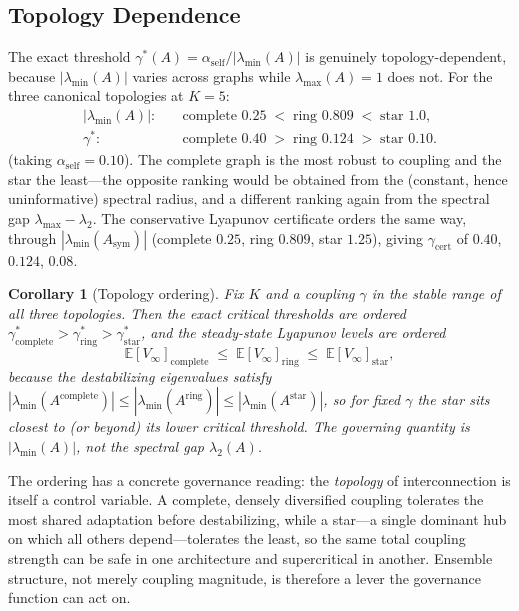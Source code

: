 \documentclass[12pt]{article}
\theoremstyle{plain}
\newtheorem{corollary}[theorem]{Corollary}
\theoremstyle{definition}
\newcommand{\E}{\mathbb{E}}
\newcommand{\abs}[1]{\left| #1 \right|}
\begin{document}
\subsection{Topology Dependence}

The exact threshold $\gamma^*(A)=\alpha_{\mathrm{self}}/\abs{\lambda_{\min}(A)}$
is genuinely topology-dependent, because $\abs{\lambda_{\min}(A)}$
varies across graphs while $\lambda_{\max}(A)=1$ does not.  For the three
canonical topologies at $K=5$:
\[
  \begin{aligned}
  \abs{\lambda_{\min}(A)}:\quad & \text{complete } 0.25 \;<\; \text{ring } 0.809 \;<\; \text{star } 1.0,\\
  \gamma^*:\quad & \text{complete } 0.40 \;>\; \text{ring } 0.124 \;>\; \text{star } 0.10.
  \end{aligned}
\]
(taking $\alpha_{\mathrm{self}}=0.10$).  The complete graph is the most
robust to coupling and the star the least---the opposite ranking would be
obtained from the (constant, hence uninformative) spectral radius, and a
different ranking again from the spectral gap $\lambda_{\max}-\lambda_2$.
The conservative Lyapunov certificate orders the same way, through
$\abs{\lambda_{\min}(A_{\mathrm{sym}})}$ (complete $0.25$, ring $0.809$,
star $1.25$), giving $\gamma_{\mathrm{cert}}$ of $0.40$, $0.124$, $0.08$.

\begin{corollary}[Topology ordering]
  \label{cor:topology}
  Fix $K$ and a coupling $\gamma$ in the stable range of all three
  topologies.  Then the exact critical thresholds are ordered
  $\gamma^*_{\mathrm{complete}} > \gamma^*_{\mathrm{ring}} > \gamma^*_{\mathrm{star}}$,
  and the steady-state Lyapunov levels are ordered
  \[
    \E[V_\infty]_{\mathrm{complete}}
    \;\leq\;
    \E[V_\infty]_{\mathrm{ring}}
    \;\leq\;
    \E[V_\infty]_{\mathrm{star}},
  \]
  because the destabilizing eigenvalues satisfy
  $\abs{\lambda_{\min}(A^{\mathrm{complete}})}
  \leq \abs{\lambda_{\min}(A^{\mathrm{ring}})}
  \leq \abs{\lambda_{\min}(A^{\mathrm{star}})}$, so for fixed $\gamma$ the
  star sits closest to (or beyond) its lower critical threshold.  The
  governing quantity is $\abs{\lambda_{\min}(A)}$, not the spectral gap
  $\lambda_2(A)$.
\end{corollary}

The ordering has a concrete governance reading: the \emph{topology} of interconnection is itself a control variable. A complete, densely diversified coupling tolerates the most shared adaptation before destabilizing, while a star---a single dominant hub on which all others depend---tolerates the least, so the same total coupling strength can be safe in one architecture and supercritical in another. Ensemble structure, not merely coupling magnitude, is therefore a lever the governance function can act on.
\end{document}
